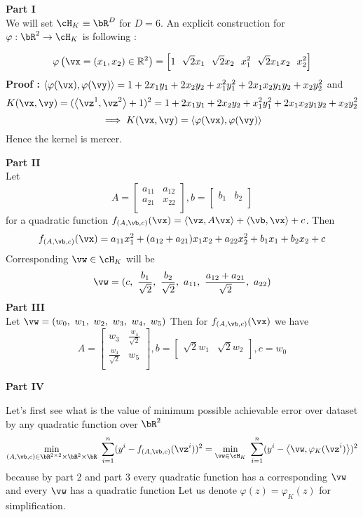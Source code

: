 \documentclass[a4paper,11pt]{article}
\begin{document}
\begin{mlsolution}
\textbf{Part I}\\
We will set $\cH_K \equiv \bR^D$ for $D = 6$. An explicit construction for $\varphi: \bR^2 \rightarrow \cH_K$ is following : 

$$\varphi\left(\vx = (x_1,x_2) \in \mathbb{R}^2\right) = \left[1\ \ \sqrt{2}x_1\ \ \sqrt{2}x_2\ \ x_1^2 \ \ \sqrt{2}x_1x_2\ \ x_2^2 \right]$$
\textbf{Proof : } $\ip{\varphi(\vx)}{\varphi(\vy)} = 1+2x_1y_1+2x_2y_2+x_1^2y_1^2+2x_1x_2y_1y_2+x_2y_2^2$ and \\
$$K(\vx,\vy) = (\ip{\vz^1}{\vz^2} + 1)^2 = 1+2x_1y_1+2x_2y_2+x_1^2y_1^2+2x_1x_2y_1y_2+x_2y_2^2 $$
$$\implies K(\vx,\vy) = \ip{\varphi(\vx)}{\varphi(\vy)}$$
Hence the kernel is mercer.

\textbf{Part II}\\
Let 
\[
 A = \begin{bmatrix}
    a_{11} & a_{12} \\
    a_{21} & x_{22} \\
\end{bmatrix},
b = \begin{bmatrix}
    b_{1} & b_{2} \\
\end{bmatrix}
\]
for a quadratic function $f_{(A,\vb,c)}(\vx) = \ip{\vz}{A\vx} + \ip{\vb}{\vx} + c$. Then 
$$f_{(A,\vb,c)}(\vx) = a_{11}x_1^2 + (a_{12}+a_{21})x_1x_2 + a_{22}x_2^2 + b_1x_1 + b_2x_2 + c$$
Corresponding $\vw \in \cH_K$ will be 
$$ \vw = (c,\ \frac{b_1}{\sqrt{2}},\ \frac{b_2}{\sqrt{2}},\ a_{11},\ \frac{a_{12} + a_{21}}{\sqrt{2}},\ a_{22})$$
\textbf{Part III}\\
Let $\vw = (w_0,\ w_1,\ w_2,\ w_3,\ w_4,\ w_5)$ Then for $f_{(A,\vb,c)}(\vx)$ we have
\[
 A = \begin{bmatrix}
    w_{3} & \frac{w_{4}}{\sqrt{2}} \\
    \frac{w_{4}}{\sqrt{2}} & w_{5} \\
\end{bmatrix},
b = \begin{bmatrix}
    \sqrt{2}w_{1} & \sqrt{2}w_{2} \\
\end{bmatrix},  c = w_0
\]


\textbf{Part IV}

Let's first see what is the value of minimum possible achievable error over dataset by any quadratic function over $\bR^2$
$$\min_{(A,\vb,c) \in \bR^{2\times 2}\times\bR^2\times \bR}\ \sum_{i=1}^n(y^i - f_{(A,\vb,c)}(\vz^i))^2
= \min_{\vw \in \cH_K}\ \sum_{i=1}^n(y^i - \ip{\vw}{\varphi_K(\vz^i)})^2$$ because by part 2 and part 3 every quadratic function has a corresponding $\vw$ and every $\vw$ has a quadratic function Let us denote $\varphi(z) = \varphi_K(z)$ for simplification.


\end{mlsolution}
\end{document}
